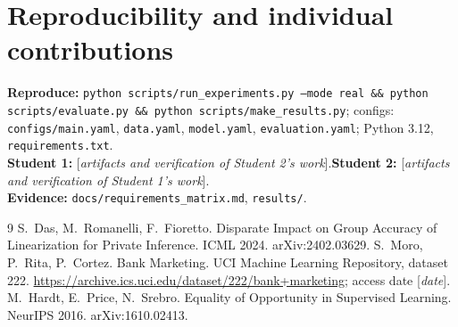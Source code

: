 \documentclass[11pt,a4paper]{article}
\newcommand{\fillin}[1]{\textnormal{[\textit{#1}]}}
\begin{document}
\section*{Reproducibility and individual contributions}
\textbf{Reproduce:} \texttt{python scripts/run\_experiments.py --mode real \&\& python scripts/evaluate.py \&\& python scripts/make\_results.py}; configs: \texttt{configs/main.yaml}, \texttt{data.yaml}, \texttt{model.yaml}, \texttt{evaluation.yaml}; Python 3.12, \texttt{requirements.txt}.\\
\textbf{Student 1:} \fillin{artifacts and verification of Student 2's work}.\quad \textbf{Student 2:} \fillin{artifacts and verification of Student 1's work}.\\
\textbf{Evidence:} \texttt{docs/requirements\_matrix.md}, \texttt{results/}.
\begin{thebibliography}{9}\small
{} S.\ Das, M.\ Romanelli, F.\ Fioretto. Disparate Impact on Group Accuracy of Linearization for Private Inference. ICML 2024. arXiv:2402.03629.
 S.\ Moro, P.\ Rita, P.\ Cortez. Bank Marketing. UCI Machine Learning Repository, dataset 222. \url{https://archive.ics.uci.edu/dataset/222/bank+marketing}; access date \fillin{date}.
 M.\ Hardt, E.\ Price, N.\ Srebro. Equality of Opportunity in Supervised Learning. NeurIPS 2016. arXiv:1610.02413.
\end{thebibliography}
\end{document}
